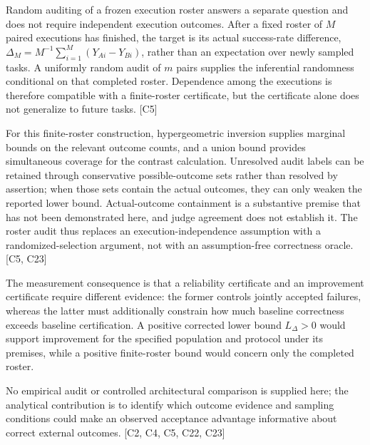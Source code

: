 \documentclass[11pt]{article}
\begin{document}
Random auditing of a frozen execution roster answers a separate question and does not require independent execution outcomes. After a fixed roster of $M$ paired executions has finished, the target is its actual success-rate difference, $\Delta_M=M^{-1}\sum_{i=1}^{M}(Y_{Ai}-Y_{Bi})$, rather than an expectation over newly sampled tasks. A uniformly random audit of $m$ pairs supplies the inferential randomness conditional on that completed roster. Dependence among the executions is therefore compatible with a finite-roster certificate, but the certificate alone does not generalize to future tasks. [C5]

For this finite-roster construction, hypergeometric inversion supplies marginal bounds on the relevant outcome counts, and a union bound provides simultaneous coverage for the contrast calculation. Unresolved audit labels can be retained through conservative possible-outcome sets rather than resolved by assertion; when those sets contain the actual outcomes, they can only weaken the reported lower bound. Actual-outcome containment is a substantive premise that has not been demonstrated here, and judge agreement does not establish it. The roster audit thus replaces an execution-independence assumption with a randomized-selection argument, not with an assumption-free correctness oracle. [C5, C23]

The measurement consequence is that a reliability certificate and an improvement certificate require different evidence: the former controls jointly accepted failures, whereas the latter must additionally constrain how much baseline correctness exceeds baseline certification. A positive corrected lower bound $L_\Delta>0$ would support improvement for the specified population and protocol under its premises, while a positive finite-roster bound would concern only the completed roster.

No empirical audit or controlled architectural comparison is supplied here; the analytical contribution is to identify which outcome evidence and sampling conditions could make an observed acceptance advantage informative about correct external outcomes. [C2, C4, C5, C22, C23]
\end{document}

